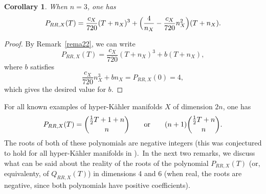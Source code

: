 \documentclass[12pt]{amsart}
\def\cO{\mathscr{O}}
\def\hKm{hyper-K\"ahler manifold}
\newtheorem{coro}[lemm]{Corollary}
\theoremstyle{remark}
\begin{document}
 
\begin{coro}\label{coro23}
When $n=3$, one has
\begin{equation}\label{prr3} 
P_{RR,X}(T)= \frac{c_X}{720}(T+n_X)^3 +\Bigl(\frac{4}{n_X}-\frac{c_X}{720}n_X^2\Bigr) (T+n_X).
\end{equation}
\end{coro}

\begin{proof}
By Remark~\ref{rema22}, we can write
 $$P_{RR,X}(T)=\frac{c_X}{720}(T+n_X)^3+b(T+n_X), 
$$
where $b$  satisfies
$$\frac{c_X}{720}n_X^3+ bn_X=P_{RR,X}(0)
=4,$$
which gives the desired value for $b$.
\end{proof}

For all known examples of \hKm s $X$ of dimension $2n$, one has
\begin{equation*}%
P_{RR,X}(T)= \binom{\frac12 T+1+n}{n}\qquad\textnormal{or}\qquad  
 (n+1)\binom{\frac12 T+n}{n}.
\end{equation*}
The roots of both of these polynomials are negative integers (this was conjectured to hold for all \hKm s in \cite[Conjecture~1.3]{jia}).\ In the next two remarks, we discuss what can be said about the reality of the  roots of the polynomial $P_{RR,X}(T)$ (or, equivalenty, of  $Q_{RR,X}(T)$) in dimensions 4 and 6 (when real, the roots are  negative, since both polynomials have positive coefficients).
\end{document}
